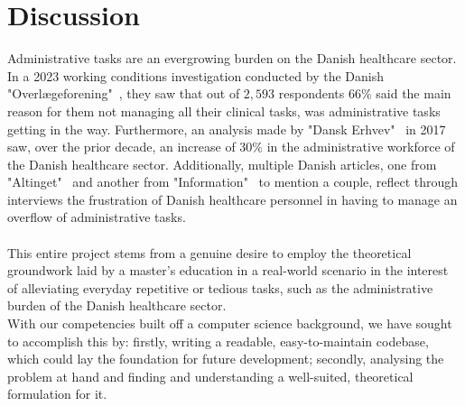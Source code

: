 \section{Discussion}
Administrative tasks are an evergrowing burden on the Danish healthcare sector\cite{Information-increase-in-admin, Dansk-Erhverv-increase-in-admin, OL-increase-in-admin, Altinget-increase-in-admin}. In a 2023 working conditions investigation conducted by the Danish "Overl\ae geforening"~\cite{OL-increase-in-admin}, they saw that out of \(2,593\) respondents  \(66\%\) said the main reason for them not managing all their clinical tasks, was administrative tasks getting in the way. Furthermore, an analysis made by "Dansk Erhvev"~\cite{Dansk-Erhverv-increase-in-admin} in 2017 saw, over the prior decade, an increase of \(30\%\) in the administrative workforce of the Danish healthcare sector. Additionally, multiple Danish articles, one from "Altinget"~\cite{Altinget-increase-in-admin} and another from "Information"~\cite{Information-increase-in-admin} to mention a couple, reflect through interviews the frustration of Danish healthcare personnel in having to manage an overflow of administrative tasks.
\\
\\
This entire project stems from a genuine desire to employ the theoretical groundwork laid by a master's education in a real-world scenario in the interest of alleviating everyday repetitive or tedious tasks, such as the administrative burden of the Danish healthcare sector. 
\\
With our competencies built off a computer science background, we have sought to accomplish this by: firstly, writing a readable, easy-to-maintain codebase, which could lay the foundation for future development; secondly, analysing the problem at hand and finding and understanding a well-suited, theoretical formulation for it.

